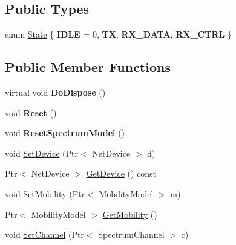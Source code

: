 \subsection*{Public Types}
\begin{DoxyCompactItemize}
\item 
enum \hyperlink{classns3_1_1millicar_1_1MmWaveSidelinkSpectrumPhy_a242b6a18fa64a2063ee36fd2d7b44e84}{State} \{ {\bfseries I\+D\+LE} = 0, 
{\bfseries TX}, 
{\bfseries R\+X\+\_\+\+D\+A\+TA}, 
{\bfseries R\+X\+\_\+\+C\+T\+RL}
 \}
\end{DoxyCompactItemize}
\subsection*{Public Member Functions}
\begin{DoxyCompactItemize}
\item 
\mbox{\label{classns3_1_1millicar_1_1MmWaveSidelinkSpectrumPhy_a868e28c54b93d5f2e321fd5c8e070991}} 
virtual void {\bfseries Do\+Dispose} ()
\item 
\mbox{\label{classns3_1_1millicar_1_1MmWaveSidelinkSpectrumPhy_a912fab89ea4a35b2e72ee84f72f97c83}} 
void {\bfseries Reset} ()
\item 
\mbox{\label{classns3_1_1millicar_1_1MmWaveSidelinkSpectrumPhy_a824c1d2a9515d14decefc949f30156d7}} 
void {\bfseries Reset\+Spectrum\+Model} ()
\item 
void \hyperlink{classns3_1_1millicar_1_1MmWaveSidelinkSpectrumPhy_a965a2aa951f0127652f916d46760ab59}{Set\+Device} (Ptr$<$ Net\+Device $>$ d)
\item 
Ptr$<$ Net\+Device $>$ \hyperlink{classns3_1_1millicar_1_1MmWaveSidelinkSpectrumPhy_ace3f5a3bf2de94bb325ad37c1738dfa3}{Get\+Device} () const
\item 
void \hyperlink{classns3_1_1millicar_1_1MmWaveSidelinkSpectrumPhy_a9892bb8ce4fccbc6e3ea04b90f453715}{Set\+Mobility} (Ptr$<$ Mobility\+Model $>$ m)
\item 
Ptr$<$ Mobility\+Model $>$ \hyperlink{classns3_1_1millicar_1_1MmWaveSidelinkSpectrumPhy_a32642929c3eafdf82ae27e6b9ece29cf}{Get\+Mobility} ()
\item 
void \hyperlink{classns3_1_1millicar_1_1MmWaveSidelinkSpectrumPhy_a52aa6d4f22a306aeb405f126bb5c6277}{Set\+Channel} (Ptr$<$ Spectrum\+Channel $>$ c)

\end{DoxyCompactItemize}
